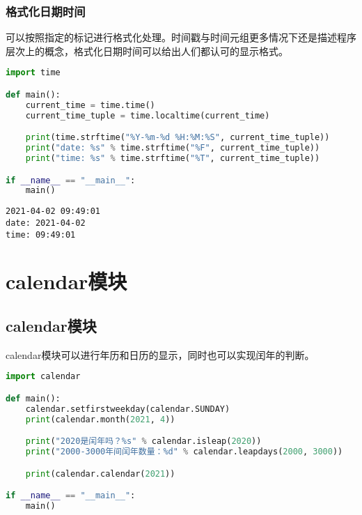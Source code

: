 \subsubsection{格式化日期时间}

可以按照指定的标记进行格式化处理。时间戳与时间元组更多情况下还是描述程序层次上的概念，格式化日期时间可以给出人们都认可的显示格式。\\


\begin{lstlisting}[language=Python]
import time

def main():
    current_time = time.time()
    current_time_tuple = time.localtime(current_time)

    print(time.strftime("%Y-%m-%d %H:%M:%S", current_time_tuple))
    print("date: %s" % time.strftime("%F", current_time_tuple))
    print("time: %s" % time.strftime("%T", current_time_tuple))

if __name__ == "__main__":
    main()
\end{lstlisting}

\begin{tcolorbox}
	\begin{verbatim}
2021-04-02 09:49:01
date: 2021-04-02
time: 09:49:01
\end{verbatim}
\end{tcolorbox}

\newpage

\section{calendar模块}

\subsection{calendar模块}

calendar模块可以进行年历和日历的显示，同时也可以实现闰年的判断。\\


\begin{lstlisting}[language=Python]
import calendar

def main():
    calendar.setfirstweekday(calendar.SUNDAY)
    print(calendar.month(2021, 4))

    print("2020是闰年吗？%s" % calendar.isleap(2020))
    print("2000-3000年间闰年数量：%d" % calendar.leapdays(2000, 3000))

    print(calendar.calendar(2021))

if __name__ == "__main__":
    main()
\end{lstlisting}

